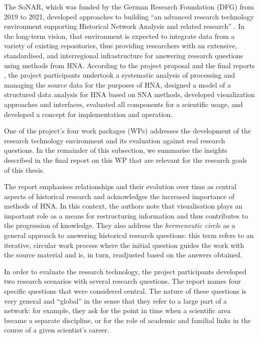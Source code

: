 The \gls{SoNAR},
which was funded by the German Research Foundation (DFG)
from 2019 to 2021,
developed approaches to building 
\enquote{an advanced research technology environment
supporting Historical Network Analysis and related research} \autocite{SoNAR}.
In the long-term vision, that environment is expected to
integrate data from a variety of existing repositories,
thus providing researchers with an extensive,
standardised, and interregional infrastructure for answering research questions
using methods from \gls{HNA}.
According to the project proposal and the final reports \autocite{SoNARreports},
the project participants undertook
a systematic analysis of processing and managing the source data
for the purposes of \gls{HNA},
designed a model of a structured data analysis for \gls{HNA} based on \gls{SNA} methods,
developed visualization approaches and interfaces,
evaluated all components for a scientific usage,
and developed a concept for implementation and operation.

One of the project's four work packages (WPs)
addresses the development of the research technology environment
and its evaluation against real research questions.
In the remainder of this subsection,
we summarise the insights described in the final report on this WP \autocite{Fangerau2022}
that are relevant for the research goals of this thesis.

The report emphasises relationships and their evolution over time
as central aspects of historical research and acknowledges the increased 
importance of methods of \gls{HNA}. In this context, the authors note that visualisation plays an important role
as a means for restructuring information and thus contributes to the progression of knowledge.
They also address the \emph{hermeneutic circle} \autocite{Malpas2015}
as a general approach to answering historical research questions:
this term refers to an iterative, circular work process
where the initial question guides the work with the source material
and is, in turn, readjusted based on the answers obtained.

In order to evaluate the research technology,
the project participants developed two research scenarios
with several research questions.
The report names four specific questions that were considered central.
The nature of these questions is very general and \enquote{global}
in the sense that they refer to a large part of a network:
for example, they ask for the point in time when a scientific area became a separate discipline,
or for the role of academic and familial links in the course of a given scientist's career.

